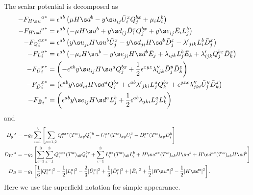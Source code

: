 The scalar potential is decomposed as
\begin{align}
-{{F_{\Hu}}^a}^*&= \epsilon^{ab}\left(
  \mu\Hd^b
- {y\s u}_{ij} \bU_i^xQ_j^{bx}
+ \mu_i L_i^b
\right)\\
-{{F_{\Hd}}^a}^*&= \epsilon^{ab}\left(
- \mu\Hu^b
+ {y\s d}_{ij} \bD_i^x Q_j^{bx}
+ {y\s e}_{ij} \bE_i   L_j^{b} 
\right)\\
-{{F_{Q}}^{ax}_i}^*&= \epsilon^{ab}\left(
{y\s u}_{ji} \Hu^{b} \bU_j^x
- {y\s d}_{ji} \Hd^{b} \bD_j^x
- {\lambda'}_{jik} L_i^b\bD_j^x
\right)\\
-{{F_{L}}^a_i}^*&= \epsilon^{ab}\left(
- \mu_i \Hu^b
- {y\s e}_{ji} \Hd^{b} \bE_j
+ \lambda_{ijk}L^b_j\bE_k
+ \lambda'_{ijk}Q_j^{bx}\bD_k^x
\right)\\
-{{F_{\bU}}^x_i}^*&=\left(
- \epsilon^{ab}{y\s u}_{ij}\Hu^a Q_j^{bx}
+ \frac12\epsilon^{xyz}\lambda''_{ijk}\bD_j^y\bD_k^z
\right)\\
-{{F_{\bD}}^x_i}^*&=\left(
  \epsilon^{ab}{y\s d}_{ij}\Hd^a Q_j^{bx}
+ \epsilon^{ab}{\lambda'}_{jki}L^a_j Q_k^{bx}
+ \epsilon^{yzx}\lambda''_{jki}\bU_j^y\bD_k^z
\right)\\
-{{F_{\bE}}_i}^*&=\left(
  \epsilon^{ab}{y\s e}_{ij}\Hd^a L_j^{b}
+ \frac12\epsilon^{ab}\lambda_{jki}L_j^aL_k^b
\right)
\end{align}
and
\begin{align}
 {D_{g}}^\alpha &= -g_3\sum_{i=1}^3\left[
  \sum_{a=1,2}Q_i^{ax*}(T^\alpha)_{xy}Q_i^{ay}
- \bU_i^{x*}(T^\alpha)_{xy}\bU_i^{y}
- \bD_i^{x*}(T^\alpha)_{xy}\bD_i^{y}
\right]\\
%
 {D_{W}}^\alpha &= -g_2\left[
  \sum_{i=1}^3\sum_{x=1}^3 Q_i^{ax*}(T^\alpha)_{ab}Q_i^{by}
+ \sum_{i=1}^3 L_i^{a*}(T^\alpha)_{ab} L_i^{b}
+ \Hu^{a*}(T^\alpha)_{ab}\Hu^b
+ \Hd^{a*}(T^\alpha)_{ab}\Hd^b
\right]\\
%
 {D_{B}} &= -g_1\left[
  \frac16|  Q_i^{ax}|^2
- \frac12|  L_i^{a} |^2
- \frac23|\bU_i^{x} |^2
+ \frac13|\bD_i^{x} |^2
+        |\bE_i     |^2
+ \frac12|\Hu  ^{a} |^2
- \frac12|\Hd  ^{a} |^2
\right].
\end{align}
Here we use the superfield notation for simple appearance.

\clearpage
